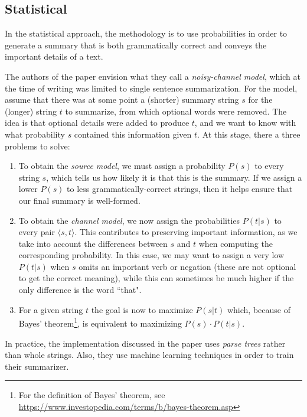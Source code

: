 \subsection{Statistical}

In the statistical approach, the methodology is to use probabilities in order to generate a summary that is both grammatically correct and conveys the important details of a text.

\mbox{}

The authors of the paper \cite{knight_statistics-based_2000} envision what they call a \textit{noisy-channel model}, which at the time of writing was limited to single sentence summarization. For the  model, assume that there was at some point a (shorter) summary string $s$ for the (longer) string $t$ to summarize, from which optional words were removed. The idea is that optional details were added to produce $t$, and we want to know with what probability $s$ contained this information given $t$. At this stage, there a three problems to solve:
\begin{enumerate}[noitemsep]
\item To obtain the \textit{source model}, we must assign a probability $P(s)$ to every string $s$, which tells us how likely it is that this is the summary. If we assign a lower $P(s)$ to less grammatically-correct strings, then it helps ensure that our final summary is well-formed.
\item To obtain the \textit{channel model}, we now assign the probabilities $P(t \vert s)$ to every pair $\langle s, t \rangle$. This contributes to preserving important information, as we take into account the differences between $s$ and $t$ when computing the corresponding probability. In this case, we may want to assign a very low $P(t \vert s)$ when $s$ omits an important verb or negation (these are not optional to get the correct meaning), while this can sometimes be much higher if the only difference is the word ``that".
\item For a given string $t$ the goal is now to maximize $P(s \vert t)$ which, because of Bayes' theorem\footnote{For the definition of Bayes' theorem, see \url{https://www.investopedia.com/terms/b/bayes-theorem.asp}}, is equivalent to maximizing $P(s) \cdot P(t \vert s)$.
\end{enumerate}

In practice, the implementation discussed in the paper uses \textit{parse trees} rather than whole strings. Also, they use machine learning techniques in order to train their summarizer.


